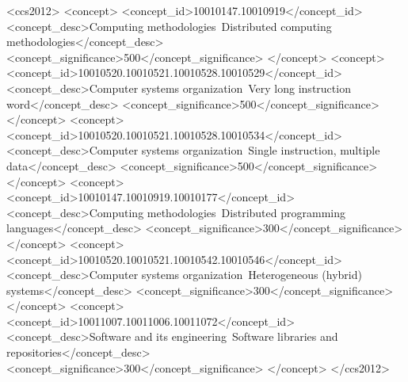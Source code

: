 \documentclass[sigconf]{acmart}
\begin{document}
%
\begin{CCSXML}
<ccs2012>
   <concept>
       <concept_id>10010147.10010919</concept_id>
       <concept_desc>Computing methodologies~Distributed computing methodologies</concept_desc>
       <concept_significance>500</concept_significance>
       </concept>
   <concept>
       <concept_id>10010520.10010521.10010528.10010529</concept_id>
       <concept_desc>Computer systems organization~Very long instruction word</concept_desc>
       <concept_significance>500</concept_significance>
       </concept>
   <concept>
       <concept_id>10010520.10010521.10010528.10010534</concept_id>
       <concept_desc>Computer systems organization~Single instruction, multiple data</concept_desc>
       <concept_significance>500</concept_significance>
       </concept>
   <concept>
       <concept_id>10010147.10010919.10010177</concept_id>
       <concept_desc>Computing methodologies~Distributed programming languages</concept_desc>
       <concept_significance>300</concept_significance>
       </concept>
   <concept>
       <concept_id>10010520.10010521.10010542.10010546</concept_id>
       <concept_desc>Computer systems organization~Heterogeneous (hybrid) systems</concept_desc>
       <concept_significance>300</concept_significance>
       </concept>
   <concept>
       <concept_id>10011007.10011006.10011072</concept_id>
       <concept_desc>Software and its engineering~Software libraries and repositories</concept_desc>
       <concept_significance>300</concept_significance>
       </concept>
 </ccs2012>
\end{CCSXML}


%
\maketitle
\end{document}

